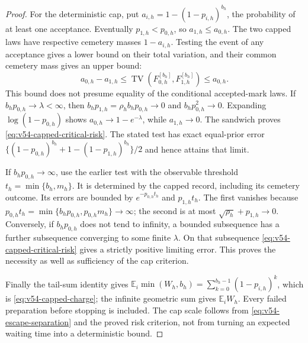 \begin{proof}
For the deterministic cap, put
$a_{i,h}=1-(1-p_{i,h})^{b_h}$, the probability of at least one acceptance.
Eventually $p_{1,h}<p_{0,h}$, so $a_{1,h}\le a_{0,h}$.
The two capped laws have respective cemetery masses $1-a_{i,h}$.
Testing the event of any acceptance gives a lower bound on their total
variation, and their common cemetery mass gives an upper bound:
\begin{equation}\label{eq:v54-capped-TV-sandwich}
 a_{0,h}-a_{1,h}
  \le \operatorname{TV}(F_{0,h}^{[b_h]},F_{1,h}^{[b_h]})
  \le a_{0,h}.
\end{equation}
This bound does not presume equality of the conditional accepted-mark
laws.  If $b_hp_{0,h}\to\lambda<\infty$, then
$b_hp_{1,h}=\rho_hb_hp_{0,h}\to0$ and
$b_hp_{0,h}^2\to0$.  Expanding $\log(1-p_{0,h})$ shows
$a_{0,h}\to1-e^{-\lambda}$, while $a_{1,h}\to0$.
The sandwich proves \eqref{eq:v54-capped-critical-risk}.  The stated
test has exact equal-prior error
$\{(1-p_{0,h})^{b_h}+1-(1-p_{1,h})^{b_h}\}/2$ and hence attains that
limit.

If $b_hp_{0,h}\to\infty$, use the earlier test with the observable
threshold $t_h=\min\{b_h,m_h\}$.  It is determined by the capped
record, including its cemetery outcome.  Its errors are bounded by
$e^{-p_{0,h}t_h}$ and $p_{1,h}t_h$.  The first vanishes because
$p_{0,h}t_h=\min\{b_hp_{0,h},p_{0,h}m_h\}\to\infty$; the second is
at most $\sqrt{\rho_h}+p_{1,h}\to0$.  Conversely, if
$b_hp_{0,h}$ does not tend to infinity, a bounded subsequence has a
further subsequence converging to some finite $\lambda$.  On that
subsequence \eqref{eq:v54-capped-critical-risk} gives a strictly
positive limiting error.  This proves the necessity as well as
sufficiency of the cap criterion.

Finally the tail-sum identity gives
$\mathbb E_i\min(W_h,b_h)=\sum_{k=0}^{b_h-1}(1-p_{i,h})^k$,
which is \eqref{eq:v54-capped-charge}; the infinite geometric sum gives
$\mathbb E_iW_h$.  Every failed preparation before stopping is included.
The cap scale follows from \eqref{eq:v54-escape-separation} and the
proved risk criterion, not from turning an expected waiting time into
a deterministic bound.



\end{proof}
